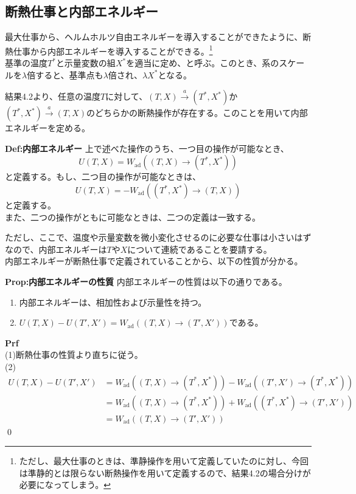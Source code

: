 \documentclass[a4paper,11pt]{jsarticle}
\numberwithin{equation}{section}
\begin{document}
\subsection{断熱仕事と内部エネルギー}
最大仕事から、ヘルムホルツ自由エネルギーを導入することができたように、断熱仕事から内部エネルギーを導入することができる。\footnote{ただし、最大仕事のときは、準静操作を用いて定義していたのに対し、今回は準静的とは限らない断熱操作を用いて定義するので、結果4.2の場合分けが必要になってしまう。}\\

    基準の温度$T^*$と示量変数の組$X^*$を適当に定め、と呼ぶ。このとき、系のスケールを$\lambda$倍すると、基準点も$\lambda$倍され、$\lambda X^*$となる。

結果4.2より、任意の温度$T$に対して、$(T,X)\xrightarrow{a} (T^*,X^*)$か$(T^*,X^*)\xrightarrow{a} (T,X)$のどちらかの断熱操作が存在する。このことを用いて内部エネルギーを定める。\\
\begin{itembox}[l]{\textbf{Def:内部エネルギー}}
上で述べた操作のうち、一つ目の操作が可能なとき、
\begin{equation}
    U(T,X) = W_{\text{ad}}((T,X)\rightarrow (T^*,X^*))
\end{equation}
と定義する。もし、二つ目の操作が可能なときは、
\begin{equation}
    U(T,X) = -W_{\text{ad}}((T^*,X^*)\rightarrow (T,X))
\end{equation}
と定義する。\\
また、二つの操作がともに可能なときは、二つの定義は一致する。
\end{itembox}
ただし、ここで、温度や示量変数を微小変化させるのに必要な仕事は小さいはずなので、内部エネルギーは$T$や$X$について連続であることを要請する。\\
内部エネルギーが断熱仕事で定義されていることから、以下の性質が分かる。\\
\begin{itembox}[l]{\textbf{Prop:内部エネルギーの性質}}
    内部エネルギーの性質は以下の通りである。
    \begin{enumerate}
        \item 内部エネルギーは、相加性および示量性を持つ。
        \item $U(T,X)-U(T',X') = W_{\text{ad}}((T,X)\rightarrow (T',X'))$である。
    \end{enumerate}
\end{itembox}
\textbf{Prf}\\
(1)断熱仕事の性質より直ちに従う。\\
(2)\\
\begin{align}
    U(T,X) - U(T',X') &= W_{\text{ad}}((T,X)\rightarrow (T^*,X^*)) - W_{\text{ad}}((T',X')\rightarrow (T^*,X^*))\\
    &= W_{\text{ad}}((T,X)\rightarrow (T^*,X^*)) + W_{\text{ad}}((T^*,X^*)\rightarrow (T',X'))\\
    &= W_{\text{ad}}((T,X)\rightarrow (T',X'))
\end{align}
\qed\\
\end{document}
